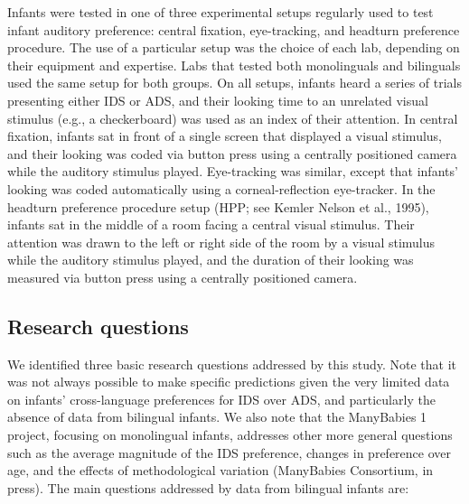 \documentclass[english,,man,floatsintext]{apa6}
\begin{document}
Infants were tested in one of three experimental setups regularly used to test infant auditory preference: central fixation, eye-tracking, and headturn preference procedure. The use of a particular setup was the choice of each lab, depending on their equipment and expertise. Labs that tested both monolinguals and bilinguals used the same setup for both groups. On all setups, infants heard a series of trials presenting either IDS or ADS, and their looking time to an unrelated visual stimulus (e.g., a checkerboard) was used as an index of their attention. In central fixation, infants sat in front of a single screen that displayed a visual stimulus, and their looking was coded via button press using a centrally positioned camera while the auditory stimulus played. Eye-tracking was similar, except that infants' looking was coded automatically using a corneal-reflection eye-tracker. In the headturn preference procedure setup (HPP; see Kemler Nelson et al., 1995), infants sat in the middle of a room facing a central visual stimulus. Their attention was drawn to the left or right side of the room by a visual stimulus while the auditory stimulus played, and the duration of their looking was measured via button press using a centrally positioned camera.

\hypertarget{research-questions}{%
\subsection{Research questions}\label{research-questions}}

We identified three basic research questions addressed by this study. Note that it was not always possible to make specific predictions given the very limited data on infants' cross-language preferences for IDS over ADS, and particularly the absence of data from bilingual infants. We also note that the ManyBabies 1 project, focusing on monolingual infants, addresses other more general questions such as the average magnitude of the IDS preference, changes in preference over age, and the effects of methodological variation (ManyBabies Consortium, in press). The main questions addressed by data from bilingual infants are:
\end{document}
